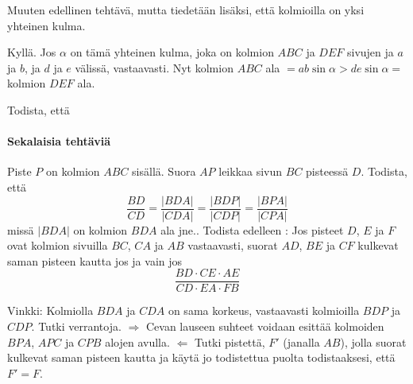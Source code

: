 \begin{tehtavasivu}
\begin{tehtava}
Muuten edellinen tehtävä, mutta tiedetään lisäksi, että kolmioilla on yksi yhteinen kulma.
\begin{vastaus}
Kyllä. Jos $\alpha$ on tämä yhteinen kulma, joka on kolmion $ABC$ ja $DEF$ sivujen ja $a$ ja $b$, ja $d$ ja $e$ välissä, vastaavasti. Nyt kolmion $ABC$ ala $= ab \sin \alpha > de \sin \alpha =$ kolmion $DEF$ ala. 
\end{vastaus}
\end{tehtava}

\begin{tehtava}
Todista, että 
\begin{vastaus}
\end{vastaus}
\end{tehtava}

\paragraph*{Sekalaisia tehtäviä}



\begin{tehtava}
Piste $P$ on kolmion $ABC$ sisällä. Suora $AP$ leikkaa sivun $BC$ pisteessä $D$. Todista, että
\[
\frac{BD}{CD} = \frac{|BDA|}{|CDA|} = \frac{|BDP|}{|CDP|} = \frac{|BPA|}{|CPA|}
\]
missä $|BDA|$ on kolmion $BDA$ ala jne.. Todista edelleen : Jos pisteet $D$, $E$ ja $F$ ovat kolmion sivuilla $BC$, $CA$ ja $AB$ vastaavasti, suorat $AD$, $BE$ ja $CF$ kulkevat saman pisteen kautta jos ja vain jos
\[
\frac{BD\cdot CE \cdot AE}{CD \cdot EA \cdot FB}
\]
\begin{vastaus}
Vinkki: Kolmiolla $BDA$ ja $CDA$ on sama korkeus, vastaavasti kolmioilla $BDP$ ja $CDP$. Tutki verrantoja. $\Rightarrow$ Cevan lauseen suhteet voidaan esittää kolmoiden $BPA$, $APC$ ja $CPB$ alojen avulla. $\Leftarrow$ Tutki pistettä, $F'$ (janalla $AB$), jolla suorat kulkevat saman pisteen kautta ja käytä jo todistettua puolta todistaaksesi, että $F' = F$.
\end{vastaus}
\end{tehtava}

\end{tehtavasivu}
